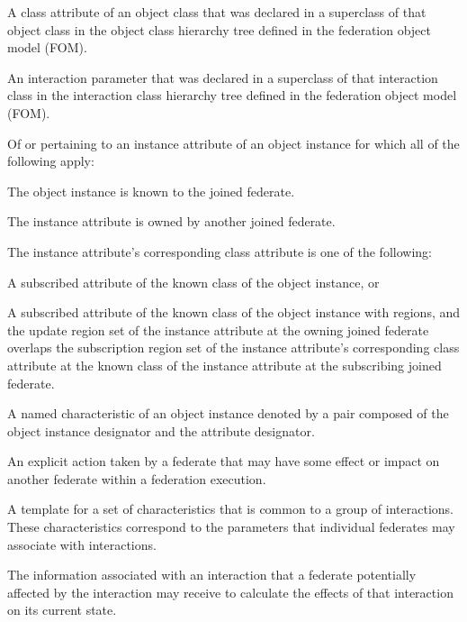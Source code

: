  A class attribute of an object class that was declared in a superclass of that object class in the object class hierarchy tree defined in the federation object model (FOM).

 An interaction parameter that was declared in a superclass of that interaction class in the interaction class hierarchy tree defined in the federation object model (FOM).

 Of or pertaining to an instance attribute of an object instance for which all of the following apply:
\begin{stdalphalist}
    \item The object instance is known to the joined federate.
    \item The instance attribute is owned by another joined federate.
    \item The instance attribute's corresponding class attribute is one of the following:
    \begin{stdnumlist}
        \item A subscribed attribute of the known class of the object instance, or
        \item A subscribed attribute of the known class of the object instance with regions, and the update region set of the instance attribute at the owning joined federate overlaps the subscription region set of the instance attribute's corresponding class attribute at the known class of the instance attribute at the subscribing joined federate.
    \end{stdnumlist}
\end{stdalphalist}

 A named characteristic of an object instance denoted by a pair composed of the object instance designator and the attribute designator.

 An explicit action taken by a federate that may have some effect or impact on another federate within a federation execution.

 A template for a set of characteristics that is common to a group of interactions. These characteristics correspond to the parameters that individual federates may associate with interactions.

 The information associated with an interaction that a federate potentially affected by the interaction may receive to calculate the effects of that interaction on its current state.

